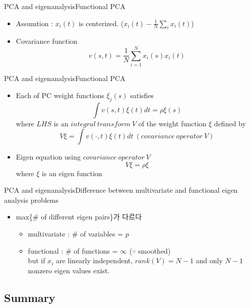 \documentclass{beamer}
\begin{document}
\begin{frame}{PCA and eigenanalysis}{Functional PCA}
	\begin{itemize}
		\item {
			Assumtion : $x_i(t)$ is centerized. ($x_i(t) - \frac{1}{N}\sum_i x_i(t)$)
		}
		\item {
			Covariance function
			$$ v(s,t) = \frac{1}{N}\sum_{i=1}^N x_i(s)x_i(t) $$
		}
	\end{itemize}
\end{frame}

\begin{frame}{PCA and eigenanalysis}{Functional PCA}
	\begin{itemize}
		\item {
			Each of PC weight functions $\xi_j(s)$ satisfies
			$$ \int v(s,t)\xi(t) dt = \rho \xi(s) $$
			where $LHS$ is an $integral \ transform \ V$ of the weight function $\xi$ defined by $$ V\xi = \int v(\cdot,t)\xi(t) dt \ (covariance \ operator \ V)$$
		}
		\item {
			Eigen equation using $covariance \ operator \ V$
			$$ V\xi = \rho\xi $$
			where $\xi$ is an eigen function
		}
	\end{itemize}
\end{frame}

\begin{frame}{PCA and eigenanalysis}{Difference between multivariate and functional eigen analysis problems}
	\begin{itemize}
		\item {
			max\{\# of different eigen pairs\}가 다르다
		}
	
	
	\begin{itemize}
		\item {
			multivariate : \# of variables = $p$
		}
		\item {
			functional : \# of functions = $\infty$ ($\because$ smoothed) \\
			but if $x_i$ are linearly independent, $rank(V)=N-1$ and only $N-1$ nonzero eigen values exist.
		}
	\end{itemize}
\end{itemize}
\end{frame}

\subsection{Summary}
\end{document}
